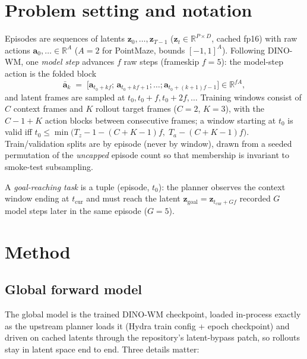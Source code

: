 \documentclass[11pt,a4paper]{article}
\newcommand{\zlat}{\mathbf{z}}
\newcommand{\act}{\mathbf{a}}
\newcommand{\abar}{\bar{\mathbf{a}}}
\begin{document}
\section{Problem setting and notation}
\label{sec:setting}

Episodes are sequences of latents $\zlat_0,\dots,\zlat_{T-1}$
($\zlat_t \in \mathbb{R}^{P\times D}$, cached fp16) with raw actions
$\act_0,\dots \in \mathbb{R}^{A}$ ($A{=}2$ for PointMaze, bounds
$[-1,1]^A$). Following DINO-WM, one \emph{model step} advances $f$ raw steps
(frameskip $f{=}5$): the model-step action is the folded block
\begin{equation}
\abar_k \;=\; \big[\act_{t_0+kf};\,\act_{t_0+kf+1};\dots;\act_{t_0+(k+1)f-1}\big]
\in \mathbb{R}^{fA},
\end{equation}
and latent frames are sampled at $t_0, t_0{+}f, t_0{+}2f,\dots$ Training
windows consist of $C$ context frames and $K$ rollout target frames
($C{=}2$, $K{=}3$), with the $C{-}1{+}K$ action blocks between consecutive
frames; a window starting at $t_0$ is valid iff
$t_0 \le \min\!\big(T_z - 1 - (C{+}K{-}1)f,\; T_a - (C{+}K{-}1)f\big)$.
Train/validation splits are by episode (never by window), drawn from a seeded
permutation of the \emph{uncapped} episode count so that membership is
invariant to smoke-test subsampling.

A \emph{goal-reaching task} is a tuple (episode, $t_0$): the planner observes
the context window ending at $t_{\mathrm{cur}}$ and must reach the latent
$\zlat_{\mathrm{goal}} = \zlat_{t_{\mathrm{cur}} + G f}$ recorded $G$ model
steps later in the same episode ($G{=}5$).

\section{Method}
\label{sec:method}

\subsection{Global forward model}
\label{sec:global}

The global model is the trained DINO-WM checkpoint, loaded in-process exactly
as the upstream planner loads it (Hydra train config + epoch checkpoint) and
driven on cached latents through the repository's latent-bypass patch, so
rollouts stay in latent space end to end. Three details matter:
\end{document}
